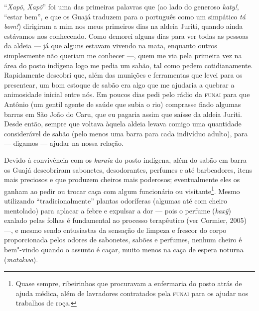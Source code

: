 ``\emph{Xapõ}, \emph{Xapõ}'' foi uma das primeiras palavras que (ao lado
do generoso \emph{katy!}, ``estar bem'', e que os Guajá traduzem para o
português como um simpático \emph{tá} \emph{bom!}) dirigiram a mim nos
meus primeiros dias na aldeia Juriti, quando ainda estávamos nos
conhecendo. Como demorei alguns dias para ver todas as pessoas da aldeia
--- já que alguns estavam vivendo na mata, enquanto outros simplesmente
não queriam me conhecer ---, quem me via pela primeira vez na área do
posto indígena logo me pedia um sabão, tal como pedem cotidianamente.
Rapidamente descobri que, além das munições e ferramentas que levei para
os presentear, um bom estoque de sabão era algo que me ajudaria a
quebrar a animosidade inicial entre nós. Em poucos dias pedi pelo rádio
da \textsc{funai} para que Antônio (um gentil agente de saúde que subia o rio)
comprasse fiado algumas barras em São João do Caru, que eu pagaria assim
que saísse da aldeia Juriti. Desde então, sempre que voltava àquela
aldeia levava comigo uma quantidade considerável de sabão (pelo menos
uma barra para cada indivíduo adulto), para --- digamos --- ajudar na nossa
relação.

Devido à convivência com os \emph{karaia} do posto indígena, além do
sabão em barra os Guajá descobriram sabonetes, desodorantes, perfumes e
até barbeadores, itens mais preciosos e que produzem cheiros mais
poderosos; eventualmente eles os ganham ao pedir ou trocar caça com
algum funcionário ou visitante\footnote{Quase sempre, ribeirinhos que
  procuravam a enfermaria do posto atrás de ajuda médica, além de
  lavradores contratados pela \textsc{funai} para os ajudar nos trabalhos de
  roça.}. Mesmo utilizando ``tradicionalmente'' plantas odoríferas
(algumas até com cheiro mentolado) para aplacar a febre e expulsar a dor
--- pois o perfume (\emph{kaxỹ}) exalado pelas folhas é fundamental ao
processo terapêutico (ver Cormier, 2005) ---, e mesmo sendo entusiastas da
sensação de limpeza e frescor do corpo proporcionada pelos odores de
sabonetes, sabões e perfumes, nenhum cheiro é bem"-vindo quando o assunto
é caçar, muito menos na caça de espera noturna (\emph{matakwa}).

